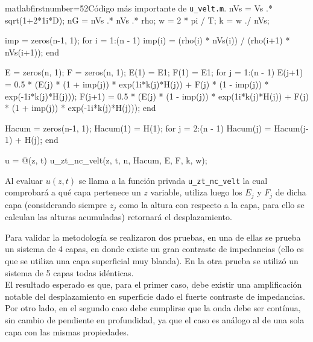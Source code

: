 \newpage
\begin{sourcecodep}{matlab}{firstnumber=52}{Código más importante de \texttt{u\_velt.m}.}
	nVs = Vs .* sqrt(1+2*1i*D); %
	nG = nVs .* nVs .* rho; %
	w = 2 * pi / T; %
	k = w ./ nVs; %
	
	imp = zeros(n-1, 1);
	for i = 1:(n - 1)
	imp(i) = (rho(i) * nVs(i)) / (rho(i+1) * nVs(i+1));
	end
	
	E = zeros(n, 1);
	F = zeros(n, 1);
	E(1) = E1;
	F(1) = E1; %
	for j = 1:(n - 1)
	E(j+1) = 0.5 * (E(j) * (1 + imp(j)) * exp(1i*k(j)*H(j)) + F(j) * (1 - imp(j)) * exp(-1i*k(j)*H(j)));
	F(j+1) = 0.5 * (E(j) * (1 - imp(j)) * exp(1i*k(j)*H(j)) + F(j) * (1 + imp(j)) * exp(-1i*k(j)*H(j)));
	end
	
	Hacum = zeros(n-1, 1);
	Hacum(1) = H(1);
	for j = 2:(n - 1)
	Hacum(j) = Hacum(j-1) + H(j);
	end
	
	u = @(z, t) u_zt_nc_velt(z, t, n, Hacum, E, F, k, w);
\end{sourcecodep}

Al evaluar $u(z,t)$ se llama a la función privada \texttt{u\_zt\_nc\_velt} la cual comprobará a qué capa pertenece un $z$ variable, utiliza luego los $E_j$ y $F_j$ de dicha capa (considerando siempre $z_j$ como la altura con respecto a la capa, para ello se calculan las alturas acumuladas) retornará el desplazamiento.


Para validar la metodología se realizaron dos pruebas, en una de ellas se prueba un sistema de 4 capas, en donde existe un gran contraste de impedancias (ello es que se utiliza una capa superficial muy blanda). En la otra prueba se utilizó un sistema de 5 capas todas idénticas. \\

El resultado esperado es que, para el primer caso, debe existir una amplificación notable del desplazamiento en superficie dado el fuerte contraste de impedancias. Por otro lado, en el segundo caso debe cumplirse que la onda debe ser contínua, sin cambio de pendiente en profundidad, ya que el caso es análogo al de una sola capa con las mismas propiedades.

